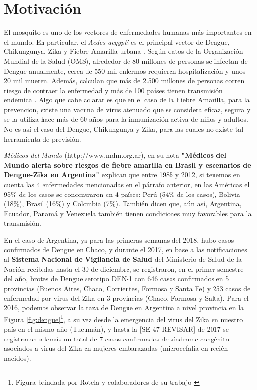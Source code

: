 



\chapter{Motivación}

\justifying
  \par El mosquito es uno de los vectores de enfermedades humanas más importantes
    en el mundo. En particular, el \textit{Aedes aegypti} es el principal vector
    de Dengue, Chikungunya, Zika y Fiebre Amarilla urbana \cite{dengue_principal}.
    Según datos de la Organización Mundial de la Salud (OMS), alrededor de 80 millones de
    personas se infectan de Dengue anualmente, cerca de 550 mil enfermos requieren hospitalización y
    unos 20 mil mueren. Además, calculan que más de 2.500 millones de personas corren
    riesgo de contraer la enfermedad y más de 100 países tienen transmisión endémica
    \cite{directices_ministerio}.
    Algo que cabe aclarar es que en el caso de la Fiebre Amarilla, para la
    prevencion, existe una vacuna de virus atenuado que se considera eficaz, segura
    y se la utiliza hace más de 60 años para la inmunización activa de niños y
    adultos. No es así el caso del Dengue, Chikungunya y Zika, para las cuales
    no existe tal herramienta de previsión.

  \par \textit{Médicos del Mundo} (http://www.mdm.org.ar), en su nota
    \textbf{"Médicos del Mundo alerta sobre riesgos de fiebre amarilla en Brasil y escenarios de Dengue-Zika en Argentina"}
    explican que entre 1985 y 2012, si tenemos en cuenta las 4 enfermedades
    mencionadas en el párrafo anterior, en las Américas el 95\% de los casos se concentraron en
    4 países: Perú (54\% de los casos), Bolivia (18\%), Brasil (16\%) y Colombia (7\%).
    También dicen que, aún así, Argentina, Ecuador, Panamá y Venezuela también tienen condiciones
    muy favorables para la transmisión.


  \par En el caso de Argentina, ya para las primeras semanas del 2018, hubo casos confirmados
    de Dengue en Chaco, y durante el 2017, en base a las notificaciones al
    \textbf{Sistema Nacional de Vigilancia de Salud} del Ministerio de Salud de la Nación
    recibidas hasta el 30 de diciembre, se registraron, en el primer semestre del año, brotes de
    Dengue serotipo DEN-1 con 646 casos confirmados en 5 provincias
    (Buenos Aires, Chaco, Corrientes, Formosa y Santa Fe) y 253 casos de enfermedad
    por virus del Zika en 3 provincias (Chaco, Formosa y Salta). Para el 2016,
    podemos observar la taza de Dengue en Argentina a nivel provincia \cite{analisis_cordoba}
    en la Figura \ref{fig:dengue}\footnote{Figura brindada por Rotela y
    colaboradores de su trabajo \cite{analisis_cordoba}}, a su vez desde la emergencia del virus del Zika en
    nuestro país en el mismo año (Tucumán), y hasta
    la [SE 47 REVISAR] de 2017 se registraron además un total de 7 casos confirmados de
    síndrome congénito asociados a virus del Zika en mujeres embarazadas
    (microcefalia en recién nacidos).



